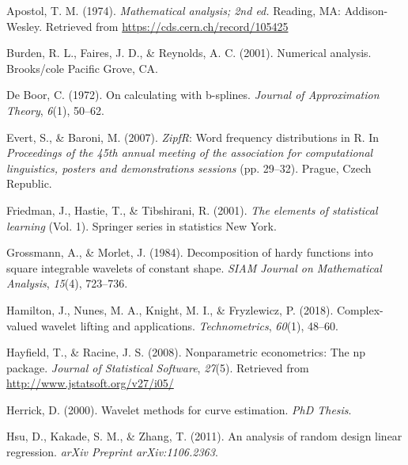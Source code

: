 \documentclass[12pt,twoside, a4paper]{reedthesis}
\begin{document}

\noindent

\setlength{\parindent}{-0.20in}
\setlength{\leftskip}{0.20in}
\setlength{\parskip}{8pt}

\hypertarget{refs}{}
\leavevmode\hypertarget{ref-Apostol:105425}{}%
Apostol, T. M. (1974). \emph{Mathematical analysis; 2nd ed.} Reading, MA: Addison-Wesley. Retrieved from \url{https://cds.cern.ch/record/105425}

\leavevmode\hypertarget{ref-burden2001numerical}{}%
Burden, R. L., Faires, J. D., \& Reynolds, A. C. (2001). Numerical analysis. Brooks/cole Pacific Grove, CA.

\leavevmode\hypertarget{ref-de1972calculating}{}%
De Boor, C. (1972). On calculating with b-splines. \emph{Journal of Approximation Theory}, \emph{6}(1), 50--62.

\leavevmode\hypertarget{ref-zipfr}{}%
Evert, S., \& Baroni, M. (2007). \emph{ZipfR}: Word frequency distributions in R. In \emph{Proceedings of the 45th annual meeting of the association for computational linguistics, posters and demonstrations sessions} (pp. 29--32). Prague, Czech Republic.

\leavevmode\hypertarget{ref-friedman2001elements}{}%
Friedman, J., Hastie, T., \& Tibshirani, R. (2001). \emph{The elements of statistical learning} (Vol. 1). Springer series in statistics New York.

\leavevmode\hypertarget{ref-grossmann1984decomposition}{}%
Grossmann, A., \& Morlet, J. (1984). Decomposition of hardy functions into square integrable wavelets of constant shape. \emph{SIAM Journal on Mathematical Analysis}, \emph{15}(4), 723--736.

\leavevmode\hypertarget{ref-hamilton2018complex}{}%
Hamilton, J., Nunes, M. A., Knight, M. I., \& Fryzlewicz, P. (2018). Complex-valued wavelet lifting and applications. \emph{Technometrics}, \emph{60}(1), 48--60.

\leavevmode\hypertarget{ref-nppack}{}%
Hayfield, T., \& Racine, J. S. (2008). Nonparametric econometrics: The np package. \emph{Journal of Statistical Software}, \emph{27}(5). Retrieved from \url{http://www.jstatsoft.org/v27/i05/}

\leavevmode\hypertarget{ref-herrick2000wavelet}{}%
Herrick, D. (2000). Wavelet methods for curve estimation. \emph{PhD Thesis}.

\leavevmode\hypertarget{ref-hsu2011analysis}{}%
Hsu, D., Kakade, S. M., \& Zhang, T. (2011). An analysis of random design linear regression. \emph{arXiv Preprint arXiv:1106.2363}.
\end{document}
